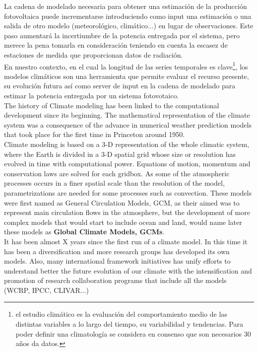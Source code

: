 La cadena de modelado necesaria para obtener una estimación de la producción fotovoltaica puede incrementarse introduciendo como input una estimación o una salida de otro modelo (meteorológico, climático...) en lugar de observaciones. Este paso aumentará la incertiumbre de la potencia entregada por el sistema, pero merece la pena tomarla en consideración teniendo en cuenta la escasez de estaciones de medida que proporcionan datos de radiación.\\

En nuestro contexto, en el cual la longitud de las series temporales es clave\footnote{el estudio climático es la evaluación del comportamiento medio de las distintas variables a lo largo del tiempo, su variabilidad y tendencias. Para poder definir una climatología se considera en consenso que son necesarios 30 años da datos.}, los modelos climáticos son una herramienta que permite evaluar el recurso presente, su evolución futura así como server de input en la cadena de modelado para estimar la potencia entregada por un sistema fotovotaico.\\  

The history of Climate modeling has been linked to the computational development since its beginning. The mathematical representation of the climate system was a consequence of the advance in numerical weather prediction models that took place for the first time in Princeton around 1950.\\

Climate modeling is based on a 3-D representation of the whole climatic system, where the Earth is divided  in a 3-D spatial grid whose size or resolution has evolved in time with computational power. Equations of motion, momentum and conservation laws are solved for each gridbox. As some of the atmospheric processes occurs in a finer spatial scale than the resolution of the model, parametrizations are needed for some processes such as convection. These models were first named as General Circulation Models, GCM, as their aimed was to represent main circulation flows in the atmosphere, but the development of more complex models that would start to include ocean and land, would name later these models as \textbf{Global Climate Models, GCMs}. \\

It has been almost X years since the first run of a climate model. In this time it has been a diversification and more research groups has developed its own models. Also, many international framework initiatives has unify efforts to understand better the future evolution of our climate with the intensification and promotion of research collaboration programs that include all the models (WCRP, IPCC, CLIVAR...)\\   

